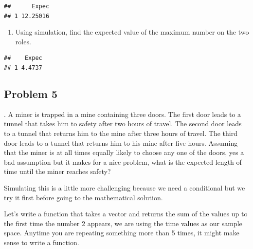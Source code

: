 \documentclass[
]{book}
\newenvironment{Shaded}{\begin{snugshade}}{\end{snugshade}}
\newcommand{\DataTypeTok}[1]{\textcolor[rgb]{0.13,0.29,0.53}{#1}}
\newcommand{\DecValTok}[1]{\textcolor[rgb]{0.00,0.00,0.81}{#1}}
\newcommand{\KeywordTok}[1]{\textcolor[rgb]{0.13,0.29,0.53}{\textbf{#1}}}
\newcommand{\NormalTok}[1]{#1}
\newcommand{\OperatorTok}[1]{\textcolor[rgb]{0.81,0.36,0.00}{\textbf{#1}}}
\newcommand{\OtherTok}[1]{\textcolor[rgb]{0.56,0.35,0.01}{#1}}
\newcommand{\StringTok}[1]{\textcolor[rgb]{0.31,0.60,0.02}{#1}}
\providecommand{\tightlist}{%
  \setlength{\itemsep}{0pt}\setlength{\parskip}{0pt}}
\begin{document}
\begin{verbatim}
##      Expec
## 1 12.25016
\end{verbatim}

\begin{enumerate}
\def\labelenumi{\alph{enumi}.}
\setcounter{enumi}{3}
\tightlist
\item
  Using simulation, find the expected value of the maximum number on the two roles.
\end{enumerate}

\begin{Shaded}
\end{Shaded}

\begin{verbatim}
##    Expec
## 1 4.4737
\end{verbatim}

\hypertarget{problem-5-4}{%
\subsection{Problem 5}\label{problem-5-4}}

. A miner is trapped in a mine containing three doors. The first door leads to a tunnel that takes him to safety after two hours of travel. The second door leads to a tunnel that returns him to the mine after three hours of travel. The third door leads to a tunnel that returns him to his mine after five hours. Assuming that the miner is at all times equally likely to choose any one of the doors, yes a bad assumption but it makes for a nice problem, what is the expected length of time until the miner reaches safety?

Simulating this is a little more challenging because we need a conditional but we try it first before going to the mathematical solution.

Let's write a function that takes a vector and returns the sum of the values up to the first time the number 2 appears, we are using the time values as our sample space. Anytime you are repeating something more than 5 times, it might make sense to write a function.
\end{document}

